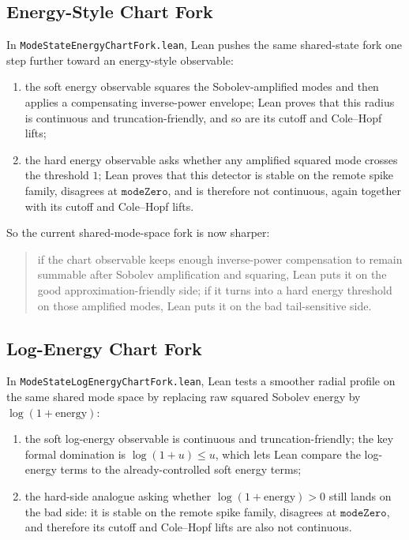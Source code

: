 \documentclass[11pt]{article}
\begin{document}
\subsection{Energy-Style Chart Fork}

In \texttt{ModeStateEnergyChartFork.lean}, Lean pushes the same shared-state
fork one step further toward an energy-style observable:
\begin{enumerate}[leftmargin=1.5em]
  \item the soft energy observable squares the Sobolev-amplified modes and
  then applies a compensating inverse-power envelope; Lean proves that this
  radius is continuous and truncation-friendly, and so are its cutoff and
  Cole--Hopf lifts;
  \item the hard energy observable asks whether any amplified squared mode
  crosses the threshold \(1\); Lean proves that this detector is stable on the
  remote spike family, disagrees at \(\texttt{modeZero}\), and is therefore not
  continuous, again together with its cutoff and Cole--Hopf lifts.
\end{enumerate}

So the current shared-mode-space fork is now sharper:
\begin{quote}
if the chart observable keeps enough inverse-power compensation to remain
summable after Sobolev amplification and squaring, Lean puts it on the good
approximation-friendly side; if it turns into a hard energy threshold on those
amplified modes, Lean puts it on the bad tail-sensitive side.
\end{quote}

\subsection{Log-Energy Chart Fork}

In \texttt{ModeStateLogEnergyChartFork.lean}, Lean tests a smoother radial
profile on the same shared mode space by replacing raw squared Sobolev energy by
\(\log(1+\mathrm{energy})\):
\begin{enumerate}[leftmargin=1.5em]
  \item the soft log-energy observable is continuous and truncation-friendly;
  the key formal domination is \(\log(1+u) \le u\), which lets Lean compare the
  log-energy terms to the already-controlled soft energy terms;
  \item the hard-side analogue asking whether \(\log(1+\mathrm{energy}) > 0\)
  still lands on the bad side: it is stable on the remote spike family,
  disagrees at \(\texttt{modeZero}\), and therefore its cutoff and Cole--Hopf
  lifts are also not continuous.
\end{enumerate}
\end{document}
